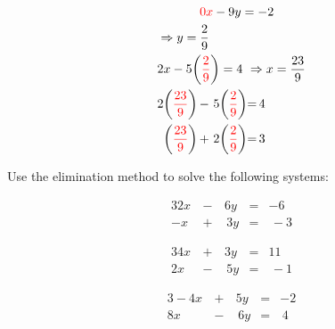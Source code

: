 \documentclass[../mathNotesPreamble]{subfiles}
\begin{document}
{{\begin{minipage}[t]{0.45\linewidth}
\begin{align*}
      &\phantom{\Rightarrow}\hspace*{24pt}\textcolor{red}{0x}-9y=-2\\
      &\Rightarrow y=\frac{2}{9}\\
      & 2x-5\parens{\textcolor{red}{\frac{2}{9}}}=4
      \ \Rightarrow x=\frac{23}{9}\\
        &\begin{array}{*{3}{@{}r@{}l}}
          2\parens{\textcolor{red}{\displaystyle\frac{23}{9}}}&\,-\,&5\parens{\textcolor{red}{\displaystyle\frac{2}{9}}}&=&4\\[10pt]
          \parens{\textcolor{red}{\displaystyle\frac{23}{9}}}&\,+&\,2\parens{\textcolor{red}{\displaystyle\frac{2}{9}}}&=&\,3
      \end{array}
    \end{align*}
    \end{minipage}%
    \vspace*{5pt}
  }}
  \pagebreak

  \begin{ex*}
    Use the elimination method to solve the following systems:
  \end{ex*}
  \noindent
  \begin{minipage}{0.25\linewidth}
    \begin{alignat*}{3}
      2x&\,-\,&6y&=&-6\\
      -x&\,+&\,3y&=&\,-3
    \end{alignat*}
  \end{minipage}%

  \noindent
  \begin{minipage}{0.25\linewidth}
    \begin{alignat*}{3}
      4x&\,+\,&3y&=&11\\
      2x&\,-&\,5y&=&\,-1
    \end{alignat*}
  \end{minipage}%

  \noindent
  \begin{minipage}{0.25\linewidth}
    \begin{alignat*}{3}
      -4x&\,+\,&5y&=&-2\\
      8x&\,-&\,6y&=&\,4
    \end{alignat*}
  \end{minipage}
  \pagebreak
\end{document}
